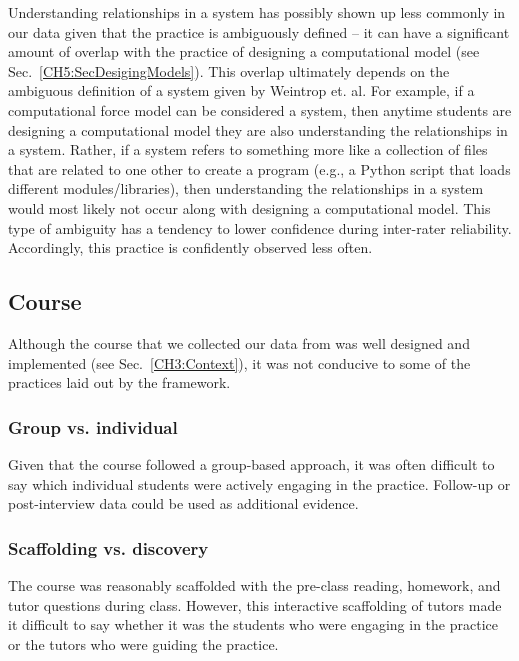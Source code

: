 \documentclass{msuphddissertation}
\begin{document}
\begin{doublespace}
Understanding relationships in a system has possibly shown up less commonly in our data given that the practice is ambiguously defined -- it can have a significant amount of overlap with the practice of designing a computational model (see Sec.~\ref{CH5:SecDesigingModels}).  This overlap ultimately depends on the ambiguous definition of a system given by Weintrop et. al.  For example, if a computational force model can be considered a system, then anytime students are designing a computational model they are also understanding the relationships in a system.  Rather, if a system refers to something more like a collection of files that are related to one other to create a program (e.g., a Python script that loads different modules/libraries), then understanding the relationships in a system would most likely not occur along with designing a computational model.  This type of ambiguity has a tendency to lower confidence during inter-rater reliability.  Accordingly, this practice is confidently observed less often.

\subsection{Course}\label{CH6:Context}

Although the course that we collected our data from was well designed and implemented (see Sec.~\ref{CH3:Context}), it was not conducive to some of the practices laid out by the framework.

\subsubsection{Group vs. individual}

Given that the course followed a group-based approach, it was often difficult to say which individual students were actively engaging in the practice.  Follow-up or post-interview data could be used as additional evidence.

\subsubsection{Scaffolding vs. discovery}

The course was reasonably scaffolded with the pre-class reading, homework, and tutor questions during class.  However, this interactive scaffolding of tutors made it difficult to say whether it was the students who were engaging in the practice or the tutors who were guiding the practice.


\end{doublespace}
\end{document}
